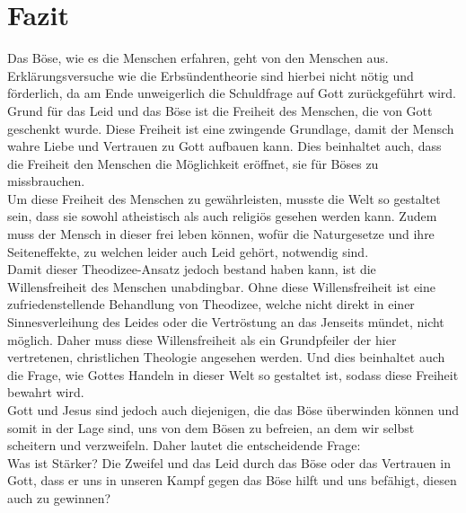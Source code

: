 \section{Fazit}
Das Böse, wie es die Menschen erfahren, geht von den Menschen aus. Erklärungsversuche wie die Erbsündentheorie sind hierbei nicht nötig und förderlich, da am Ende unweigerlich die Schuldfrage auf Gott zurückgeführt wird. Grund für das Leid und das Böse ist die Freiheit des Menschen, die von Gott geschenkt wurde. Diese Freiheit ist eine zwingende Grundlage, damit der Mensch wahre Liebe und Vertrauen zu Gott aufbauen kann. Dies beinhaltet auch, dass die Freiheit den Menschen die Möglichkeit eröffnet, sie für Böses zu missbrauchen.\\

Um diese Freiheit des Menschen zu gewährleisten, musste die Welt so gestaltet sein, dass sie sowohl atheistisch als auch religiös gesehen werden kann. Zudem muss der Mensch in dieser frei leben können, wofür die Naturgesetze und ihre Seiteneffekte, zu welchen leider auch Leid gehört, notwendig sind.\\

Damit dieser Theodizee-Ansatz jedoch bestand haben kann, ist die Willensfreiheit des Menschen unabdingbar. Ohne diese Willensfreiheit ist eine zufriedenstellende Behandlung von Theodizee, welche nicht direkt in einer Sinnesverleihung des Leides oder die Vertröstung an das Jenseits mündet, nicht möglich. Daher muss diese Willensfreiheit als ein Grundpfeiler der hier vertretenen, christlichen Theologie angesehen werden. Und dies beinhaltet auch die Frage, wie Gottes Handeln in dieser Welt so gestaltet ist, sodass diese Freiheit bewahrt wird.\\

Gott und Jesus sind jedoch auch diejenigen, die das Böse überwinden können und somit in der Lage sind, uns von dem Bösen zu befreien, an dem wir selbst scheitern und verzweifeln. Daher lautet die entscheidende Frage:\\
Was ist Stärker? Die Zweifel und das Leid durch das Böse oder das Vertrauen in Gott, dass er uns in unseren Kampf gegen das Böse hilft und uns befähigt, diesen auch zu gewinnen?
